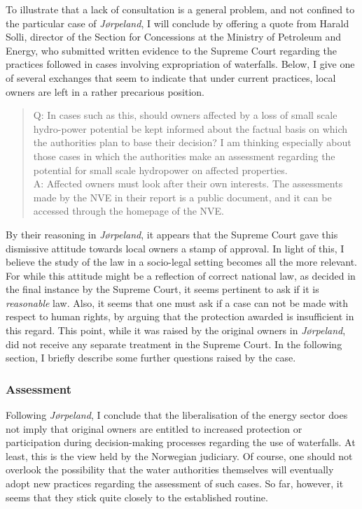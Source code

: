 To illustrate that a lack of consultation is a general problem, and not confined to the particular case of {\it Jørpeland}, I will conclude by offering a quote from Harald Solli, director of the Section for Concessions at the Ministry of Petroleum and Energy, who submitted written evidence to the Supreme Court regarding the practices followed in cases involving expropriation of waterfalls. Below, I give one of several exchanges that seem to indicate that under current practices, local owners are left in a rather precarious position.

\begin{quote}
Q: In cases such as this, should owners affected by a loss of small scale hydro-power potential be kept informed about the factual basis on which the authorities plan to base their decision? I am thinking especially about those cases in which the authorities make an assessment regarding the potential for small scale hydropower on affected properties. \\
A: Affected owners must look after their own interests. The assessments made by the NVE in their report is a public document, and it can be accessed through the homepage of the NVE.
\end{quote}

By their reasoning in \emph{Jørpeland}, it appears that the Supreme Court gave this dismissive attitude towards local owners a stamp of approval. In light of this, I believe the study of the law in a socio-legal setting becomes all the more relevant. For while this attitude might be a reflection of correct national law, as decided in the final instance by the Supreme Court, it seems pertinent to ask if it is \emph{reasonable} law. Also, it seems that one must ask if a case can not be made with respect to human rights, by arguing that the protection awarded is insufficient in this regard. This point, while it was raised by the original owners in \emph{Jørpeland}, did not receive any separate treatment in the Supreme Court. In the following section, I briefly describe some further questions raised by the case.

\subsubsection{Assessment}

Following \emph{Jørpeland}, I conclude that the liberalisation of the energy sector does not imply that original owners are entitled to increased protection or participation during decision-making processes regarding the use of waterfalls. At least, this is the view held by the Norwegian judiciary. Of course,  one should not overlook the possibility that the water authorities themselves will eventually adopt new practices regarding the assessment of such cases. So far, however, it seems that they stick quite closely to the established routine.

